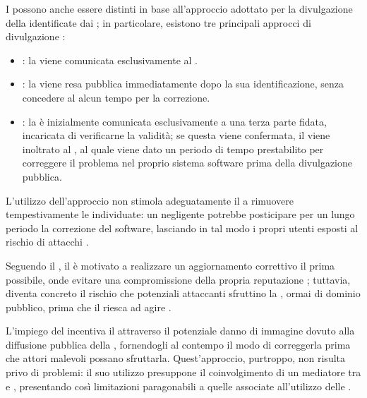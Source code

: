 I \BBP possono anche essere distinti in base all'approccio adottato per la divulgazione della \vulnerability identificate dai \BH; in particolare, esistono tre principali approcci di divulgazione \cite{lisi2022ard, cavusoglu2007vulndisc}:
\begin{itemize}

\item \FullVendorDisclosure: la \vulnerability viene comunicata esclusivamente al \BI.

\item \FullPublicDisclosure: la \vulnerability viene resa pubblica immediatamente dopo la sua identificazione, senza concedere al \BI alcun tempo per la correzione.

\item \ResponsibleDisclosure: la \vulnerability è inizialmente comunicata esclusivamente a una terza parte fidata, incaricata di verificarne la validità; se questa viene confermata, il \bugreport viene inoltrato al \BI, al quale viene dato un periodo di tempo prestabilito per correggere il problema nel proprio sistema software prima della divulgazione pubblica.
\end{itemize}

L'utilizzo dell'approccio \fullvendordisclosure non stimola adeguatamente il \BI a rimuovere tempestivamente le \vulnerability individuate: un \BI negligente potrebbe posticipare per un lungo periodo la correzione del software, lasciando in tal modo i propri utenti esposti al rischio di attacchi \cite{lisi2022ard, cavusoglu2007vulndisc}.

\medskip

Seguendo il \fullpublicdisclosure, il \BI è motivato a realizzare un aggiornamento correttivo il prima possibile, onde evitare una compromissione della propria reputazione \cite{cavusoglu2007vulndisc, arora2010vulndisc}; tuttavia, diventa concreto il rischio che potenziali attaccanti sfruttino la \vulnerability, ormai di dominio pubblico, prima che il \BI riesca ad agire \cite{lisi2022ard, cavusoglu2007vulndisc, arora2010vulndisc}.

\medskip

L'impiego del \responsibledisclosure incentiva il \BI attraverso il potenziale danno di immagine dovuto alla diffusione pubblica della \vulnerability, fornendogli al contempo il modo di correggerla prima che attori malevoli possano sfruttarla. Quest'approccio, purtroppo, non risulta privo di problemi: il suo utilizzo presuppone il coinvolgimento di un mediatore tra \BI e \BH, presentando così limitazioni paragonabili a quelle associate all'utilizzo delle \bugbountyplatform.

